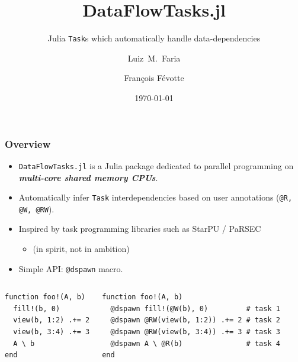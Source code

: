 \documentclass{beamer}
\title[DataFlowTasks] %
{DataFlowTasks.jl}
\subtitle{Julia \texttt{Task}s which automatically handle data-dependencies}
\author[Faria, Févotte] %
{Luiz~M.~Faria\inst{1} \and François Févotte\inst{2}}
\institute[]
{
    \inst{1}%
    Research scientist\\
    INRIA
    \and
    \inst{2}%
    Chief Scientist\\
    TriScale innov
}
\date{\today}
\newcommand{\DFT}{\texttt{DataFlowTasks.jl}}
\begin{document}
\frame{\titlepage}

\begin{frame}[fragile]
\frametitle{Overview}

\begin{itemize}
    \item \DFT{} is a Julia package dedicated to parallel programming on
      \textit{\textbf{multi-core shared memory CPUs}}.
    \item Automatically infer \texttt{Task} interdependencies based on user annotations (\texttt{@R, @W, @RW}).
    \item Inspired by task programming libraries such as StarPU / PaRSEC
      \begin{itemize}
      \item (in spirit, not in ambition)
      \end{itemize}
    \item Simple API: \texttt{@dspawn} macro.
\end{itemize}
%
\begin{columns}[t]
\begin{exampleblock}{}
\begin{verbatim}
function foo!(A, b)
  fill!(b, 0)
  view(b, 1:2) .+= 2
  view(b, 3:4) .+= 3
  A \ b
end
\end{verbatim}
\end{exampleblock}
\center {}
 

\begin{exampleblock}{}
\begin{verbatim}
function foo!(A, b)
  @dspawn fill!(@W(b), 0)         # task 1
  @dspawn @RW(view(b, 1:2)) .+= 2 # task 2
  @dspawn @RW(view(b, 3:4)) .+= 3 # task 3
  @dspawn A \ @R(b)               # task 4
end
\end{verbatim}
\end{exampleblock}
\center {}

\end{columns}


\end{frame}
\end{document}

